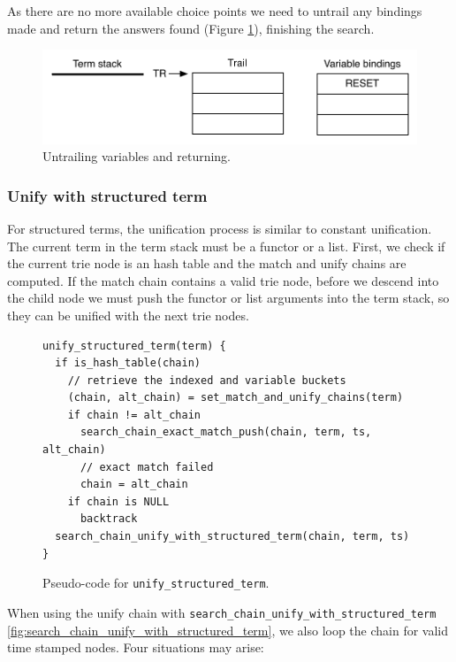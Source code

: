 As there are no more available choice points we need to untrail any bindings made and return
the answers found (Figure \ref{fig:collect_ex6}), finishing the search.

\begin{figure}[H]
  \centering
    \includegraphics[scale=0.6]{collect_ex6.pdf}
  \caption{Untrailing variables and returning.}
  \label{fig:collect_ex6}
\end{figure}

\subsubsection{Unify with structured term}

For structured terms, the unification process is similar to constant unification. The
current term in the term stack must be a functor or a list. First, we check if the current
trie node is an hash table and the match and unify chains are computed.
If the match chain contains a valid trie node, before we descend into the child
node we must push the functor or list arguments into the term stack, so they can
be unified with the next trie nodes.

\begin{figure}[H]
\begin{Verbatim}[fontsize=\small]
unify_structured_term(term) {
  if is_hash_table(chain)
    // retrieve the indexed and variable buckets
    (chain, alt_chain) = set_match_and_unify_chains(term)
    if chain != alt_chain
      search_chain_exact_match_push(chain, term, ts, alt_chain)
      // exact match failed
      chain = alt_chain
    if chain is NULL
      backtrack
  search_chain_unify_with_structured_term(chain, term, ts)
}
\end{Verbatim}
\caption{Pseudo-code for \texttt{unify\_structured\_term}.}
\label{fig:unify_structured_term}
\end{figure}

When using the unify chain with \texttt{search\_chain\_unify\_with\_structured\_term}
\ref{fig:search_chain_unify_with_structured_term},
we also loop the chain for valid time stamped nodes.
Four situations may arise:

